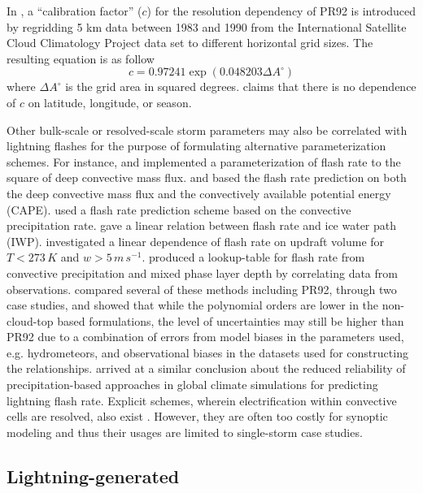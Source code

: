 	In \citet{Price:1994fk}, a ``calibration factor'' ($c$) for the resolution dependency of PR92 is introduced by regridding 5 km data between 1983 and 1990 from the International Satellite Cloud Climatology Project data set \citep[ISCCP;][]{Rossow:1991aa} to different horizontal grid sizes. The resulting equation is as follow
	\begin{equation}\label{eqn:pr94-calib}
		c = 0.97241\exp(0.048203 \Delta A^\circ)
	\end{equation}
	where $\Delta A^\circ$ is the grid area in squared degrees. \citet{Price:1994fk} claims that there is no dependence of $c$ on latitude, longitude, or season.

	Other bulk-scale or resolved-scale storm parameters may also be correlated with lightning flashes for the purpose of formulating alternative parameterization schemes. For instance, \citet{Allen:2002fk} and \citet{Allen:2010fk} implemented a parameterization of flash rate to the square of deep convective mass flux. \citet{Zhao:2009kx} and \citet{Choi:2005uq} based the flash rate prediction on both the deep convective mass flux and the convectively available potential energy (CAPE). \citet{Allen:2012fk} used a flash rate prediction scheme based on the convective precipitation rate. \citet{Petersen:2005fk} gave a linear relation between flash rate and ice water path (IWP). \citet{Deierling:2008uq} investigated a linear dependence of flash rate on updraft volume for $T<273\,\unit{K}$ and $w>5\,\unit{m\,s^{-1}}$. \citet{Hansen:2012aa} produced a lookup-table for flash rate from convective precipitation and mixed phase layer depth by correlating data from observations. \citet{Barthe:2010uq} compared several of these methods including PR92, through two case studies, and showed that while the polynomial orders are lower in the non-cloud-top based formulations, the level of uncertainties may still be higher than PR92 due to a combination of errors from model biases in the parameters used, e.g. hydrometeors, and observational biases in the datasets used for constructing the relationships. \citet{Futyan:2007fk} arrived at a similar conclusion about the reduced reliability of precipitation-based approaches in global climate simulations for predicting lightning flash rate. Explicit schemes, wherein electrification within convective cells are resolved, also exist \citep[e.g.][]{Barthe:2005zr,Zhang:2003tp}. However, they are often too costly for synoptic modeling and thus their usages are limited to single-storm case studies.

\subsection{Lightning-generated } \label{ssec:intro/lightning/lnox}
	
